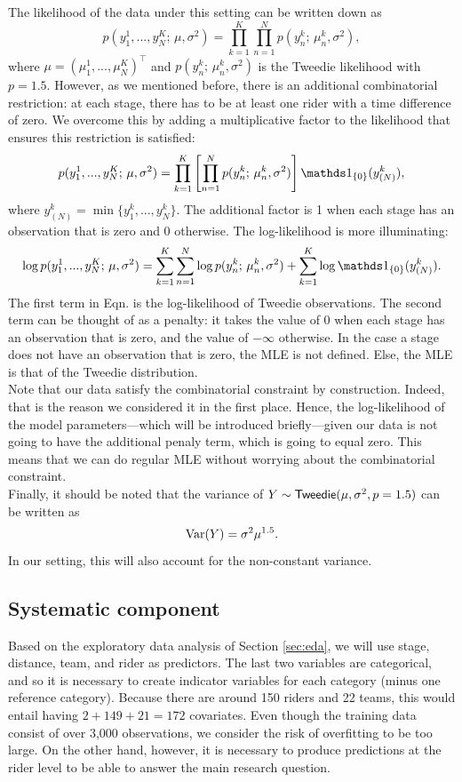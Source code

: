 \documentclass[aos,preprint]{imsart}
\begin{document}
The likelihood of the data under this setting can be written down as
\[
  p(y_1^1, ..., y_N^K; \, \mu, \sigma^2) = \prod_{k=1}^K \prod_{n=1}^N p(y_n^k; \, \mu_n^k, \sigma^2),
\]
where $\mu = (\mu_1^1, ..., \mu_N^K)^\top$ and $p(y_n^k; \, \mu_n^k, \sigma^2)$ is the Tweedie likelihood with $p=1.5$. However, as we mentioned before, there is an additional combinatorial restriction: at each stage, there has to be at least one rider with a time difference of zero. We overcome this by adding a multiplicative factor to the likelihood that ensures this restriction is satisfied:
\[
  p(y_1^1, ..., y_N^K; \, \mu, \sigma^2) = \prod_{k=1}^K \left[ \prod_{n=1}^N p(y_n^k; \, \mu_n^k, \sigma^2) \right] \ind_{\{ 0\}} (y_{(N)}^k),
\]
where $y_{(N)}^k = \min \{y_1^k, ..., y_N^k \}$. The additional factor is 1 when each stage has an observation that is zero and 0 otherwise. The log-likelihood is more illuminating:
\[
  \log p(y_1^1, ..., y_N^K; \, \mu, \sigma^2) = \sum_{k=1}^K \sum_{n=1}^N \log p(y_n^k; \, \mu_n^k, \sigma^2) + \sum_{k=1}^K \log \ind_{\{ 0\}} (y_{(N)}^k). \label{eq:loglike}
\]
The first term in Eqn.  is the log-likelihood of \iid Tweedie observations. The second term can be thought of as a penalty: it takes the value of 0 when each stage has an observation that is zero, and the value of $-\infty$ otherwise. In the case a stage does not have an observation that is zero, the MLE is not defined. Else, the MLE is that of the Tweedie distribution. \\


Note that our data satisfy the combinatorial constraint by construction. Indeed, that is the reason we considered it in the first place. Hence, the log-likelihood of the model parameters---which will be introduced briefly---given our data is not going to have the additional penaly term, which is going to equal zero. This means that we can do regular MLE without worrying about the combinatorial constraint. \\


Finally, it should be noted that the variance of $Y \sim {\sf{Tweedie}}(\mu, \sigma^2, p = 1.5)$ can be written as
\[
  \operatorname{Var} (Y) = \sigma^2 \mu^{1.5}.
\]
In our setting, this will also account for the non-constant variance.


\subsection{Systematic component}


Based on the exploratory data analysis of Section \ref{sec:eda}, we will use stage, distance, team, and rider as predictors. The last two variables are categorical, and so it is necessary to create indicator variables for each category (minus one reference category). Because there are around 150 riders and 22 teams, this would entail having $2+149+21 = 172$ covariates. Even though the training data consist of over 3,000 observations, we consider the risk of overfitting to be too large. On the other hand, however, it is necessary to produce predictions at the rider level to be able to answer the main research question. \\
\end{document}
